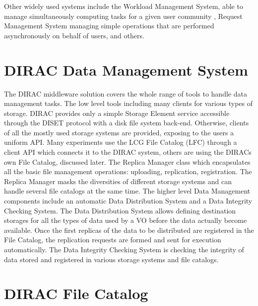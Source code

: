 Other widely used systems include the Workload Management System, able to manage simultaneously computing
tasks for a given user community \cite{WMS}, Request Management System managing simple operations that 
are performed asynchronously on behalf of users, and others. 

\section{DIRAC Data Management System}

The DIRAC middleware solution covers the whole range of tools to handle data management tasks. The low level 
tools including many clients for various types of storage. DIRAC provides only a simple Storage Element service 
accessible through the DISET protocol with a disk file system back-end. Otherwise, clients of all 
the mostly used storage systems are provided, exposing to the users a uniform API. Many experiments use the LCG
File Catalog (LFC) through a client API which connects it to the DIRAC system, others are using 
the DIRACs own File Catalog, discussed later. The Replica Manager class which encapsulates all the basic file 
management operations: uploading, replication, registration. The Replica Manager masks the diversities 
of different storage systems and can handle several file catalogs at the same time. 
The higher level Data Management components include an automatic Data Distribution System and
a Data Integrity Checking System. The Data Distribution System allows defining destination storages
for all the types of data used by a VO before the data actually become available. Once the first replicas
of the data to be distributed are registered in the File Catalog, the replication requests are formed and
sent for execution automatically. The Data Integrity Checking System is checking the integrity of data stored and
registered in various storage systems and file catalogs. 

\section{DIRAC File Catalog}

